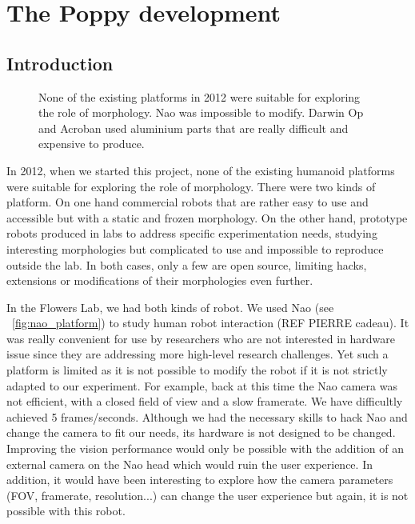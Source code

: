 
\cleartoleftpage

\chapter{The Poppy development} %


\section{Introduction} %

\begin{figure}[tb]
\centering
    \hfil
    \hfil
    \caption{None of the existing platforms in 2012 were suitable for exploring the role of morphology. Nao was impossible to modify. Darwin Op and Acroban used aluminium parts that are really difficult and expensive to produce.}
    \label{fig:2012_Humanoids}
\end{figure}

In 2012, when we started this project, none of the existing humanoid platforms were suitable for exploring the role of morphology. There were two kinds of platform. On one hand commercial robots that are rather easy to use and accessible but with a static and frozen morphology. On the other hand, prototype robots produced in labs to address specific experimentation needs, studying interesting morphologies but complicated to use and impossible to reproduce outside the lab. In both cases, only a few are open source, limiting hacks, extensions or modifications of their morphologies even further.




In the Flowers Lab, we had both kinds of robot. We used Nao (see \figurename~\ref{fig:nao_platform}) to study human robot interaction (REF PIERRE cadeau). It was really convenient for use by researchers who are not interested in hardware issue since they are addressing more high-level research challenges. Yet such a platform is limited as it is not possible to modify the robot if it is not strictly adapted to our experiment. For example, back at this time the Nao camera was not efficient, with a closed field of view and a slow framerate. We have difficultly achieved 5 frames/seconds. Although we had the necessary skills to hack Nao and change the camera to fit our needs, its hardware is not designed to be changed. Improving the vision performance would only be possible with the addition of an external camera on the Nao head which would ruin the user experience. In addition, it would have been interesting to explore how the camera parameters (FOV, framerate, resolution...) can change the user experience but again, it is not possible with this robot.



